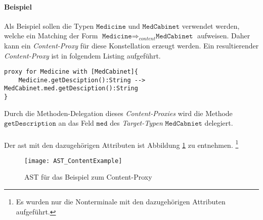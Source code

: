 \paragraph{Beispiel} Als Beispiel sollen die Typen $\texttt{Medicine}$ und $\texttt{MedCabinet}$ verwendet werden, welche ein Matching der Form $\texttt{Medicine} \Rightarrow_{content} \texttt{MedCabinet}$ aufweisen. Daher kann ein \emph{Content-Proxy} für diese Konstellation erzeugt werden. Ein resultierender \emph{Content-Proxy} ist in folgendem Listing aufgeführt.
\begin{lstlisting}[style = dsl, caption = Content-Proxy für Medicine, captionpos = b]
proxy for Medicine with [MedCabinet]{
	Medicine.getDesciption():String --> MedCabinet.med.getDesciption():String
}
\end{lstlisting}
Durch die Methoden-Delegation dieses \emph{Content-Proxies} wird die Methode $\texttt{getDescription}$ an das Feld $\texttt{med}$ des \emph{Target-Typen} $\texttt{MedCabniet}$ delegiert.\\\\
Der \acrshort{ast} mit den dazugehörigen Attributen ist Abbildung \ref{fig:ASTCONTENT} zu entnehmen. \footnote{Es wurden nur die Nonterminale mit den dazugehörigen Attributen aufgeführt.}
\begin{figure}[h!]
\centering
\texttt{[image: AST\_ContentExample]}
\caption{AST für das Beispiel zum Content-Proxy}
\label{fig:ASTCONTENT}
\end{figure}
\noindent
